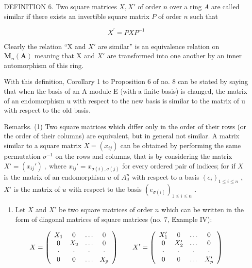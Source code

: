 DEFINITION 6. Two square matrices \(X, X'\) of order \(n\) over a ring \(A\) are called similar if there exists an invertible square matrix \(P\) of order \(n\) such that

\[
X ^ {\prime} = P X P ^ {- 1}\tag{41}
\]

Clearly the relation ``X and \(X'\) are similar'' is an equivalence relation on \(\mathbf{M}_{n}(\mathbf{A})\) meaning that X and \(X'\) are transformed into one another by an inner automorphism of this ring.

With this definition, Corollary 1 to Proposition 6 of no. 8 can be stated by saying that when the basis of an A-module E (with a finite basis) is changed, the matrix of an endomorphism u with respect to the new basis is similar to the matrix of u with respect to the old basis.

Remarks. (1) Two square matrices which differ only in the order of their rows (or the order of their columns) are equivalent, but in general not similar. A matrix similar to a square matrix \(X = (x_{ij})\) can be obtained by performing the same permutation \(\sigma^{-1}\) on the rows and columns, that is by considering the matrix \(X' = (x_{ij}')\) , where \(x_{ij}' = x_{\sigma(i),\sigma(j)}\) for every ordered pair of indices; for if \(X\) is the matrix of an endomorphism \(u\) of \(A_d^n\) with respect to a basis \((e_i)_{1 \leq i \leq n}\) , \(X'\) is the matrix of \(u\) with respect to the basis \((e_{\sigma(i)})_{1 \leq i \leq n}\) .

\begin{enumerate}
\def\labelenumi{(\arabic{enumi})}
\setcounter{enumi}{1}
\tightlist
\item
  Let \(X\) and \(X'\) be two square matrices of order \(n\) which can be written in the form of diagonal matrices of square matrices (no. 7, Example IV):
\end{enumerate}

\[
X = \left( \begin{array}{c c c c} X _ {1} & 0 & \ldots & 0 \\ 0 & X _ {2} & \ldots & 0 \\ \cdot & \cdot & \cdot & \cdot \\ 0 & 0 & \ldots & X _ {p} \end{array} \right) \qquad X ^ {\prime} = \left( \begin{array}{c c c c} X _ {1} ^ {\prime} & 0 & \ldots & 0 \\ 0 & X _ {2} ^ {\prime} & \ldots & 0 \\ \cdot & \cdot & \cdot & \cdot \\ 0 & 0 & \ldots & X _ {p} ^ {\prime} \end{array} \right)
\]

